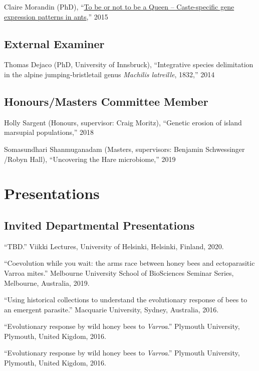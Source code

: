 \documentclass[11pt]{article}
\def\printdate#1{\xprintdate#1-}
\def\xprintdate#1-#2-#3-{#1}
\begin{document}
\ind Claire Morandin (PhD), ``\href{https://pdfs.semanticscholar.org/ce84/0a0475d80c276d36c4e6f6fa7a00d0f3524c.pdf}{To be or not to be a Queen -- Caste-specific gene expression patterns in
ants},'' 2015

\subsection{External Examiner}
\ind Thomas Dejaco (PhD, University of Innsbruck), ``Integrative species delimitation in the alpine jumping‐bristletail genus
\textit{Machilis latreille}, 1832,'' 2014

\subsection{Honours/Masters Committee Member}
\ind Holly Sargent (Honours, supervisor: Craig Moritz), ``Genetic erosion of island marsupial populations,'' 2018

\ind Somasundhari Shanmuganadam (Masters, supervisors: Benjamin Schwessinger /Robyn Hall), ``Uncovering the Hare microbiome,'' 2019


\section{Presentations}

\subsection{Invited Departmental Presentations}

\ind ``TBD.'' Viikki Lectures, University of Helsinki, Helsinki, Finland, \printdate{2020-00-00}.


\ind ``Coevolution while you wait: the arms race between honey bees and
ectoparasitic Varroa mites.'' Melbourne University School of BioSciences Seminar Series, Melbourne, Australia, \printdate{2019-00-00}.








\ind ``Using historical collections to understand the evolutionary response of
bees to an emergent parasite.'' Macquarie University, Sydney, Australia, \printdate{2016-00-00}.


\ind ``Evolutionary response by wild honey bees to \textit{Varroa}.'' Plymouth University, Plymouth, United Kigdom, \printdate{2016-00-00}.


\ind ``Evolutionary response by wild honey bees to \textit{Varroa}.'' Plymouth University, Plymouth, United Kigdom, \printdate{2016-00-00}.
\end{document}
